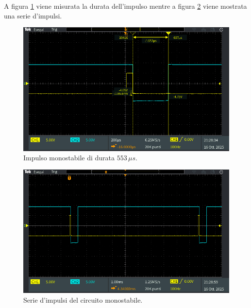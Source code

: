 \documentclass[a4paper,12pt]{article}
\begin{document}
\noindent A figura \ref{fig:monostabile_impulso_durata} viene misurata la durata dell'impulso mentre a figura \ref{fig:monostabile_impulsi} viene mostrata una serie d'impulsi.
\begin{figure}[h]
	\centering
	\includegraphics[width=0.7\linewidth]{immagini/monostabile/monostabile_durata.PNG}
	\caption{Impulso monostabile di durata $ 553\,\mu s$.}
	\label{fig:monostabile_impulso_durata}
\end{figure}

\begin{figure}[h]
	\centering
	\includegraphics[width=0.7\linewidth]{immagini/monostabile/monostabile_impulsi.PNG}
	\caption{Serie d'impulsi del circuito monostabile.}
	\label{fig:monostabile_impulsi}
\end{figure}
\end{document}
